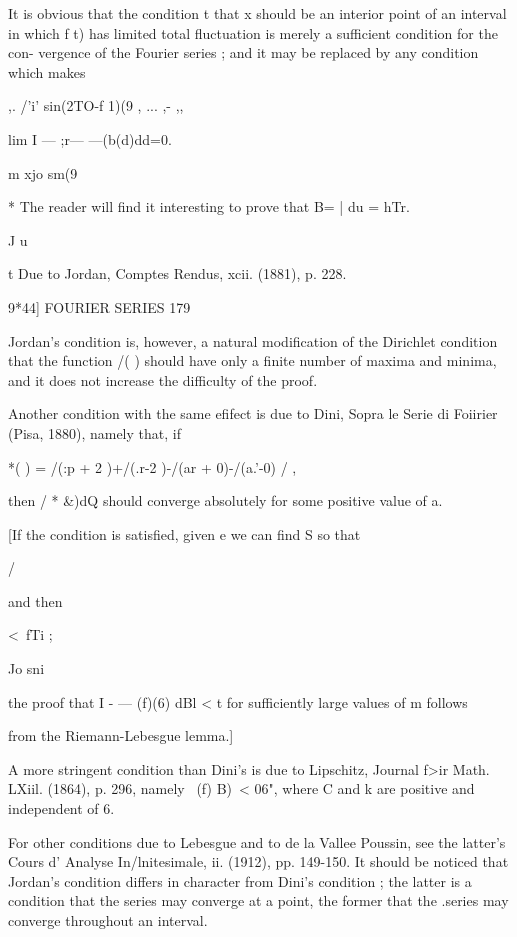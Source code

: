 It is obvious that the condition t that x should be an interior point
of an interval in which f t) has limited total fluctuation is merely a
sufficient condition for the con- vergence of the Fourier series ; and
it may be replaced by any condition which makes

,. /'i' sin(2TO-f 1)(9 , ... ,- ,,

lim I — ;r— —(b(d)dd=0.

m xjo sm(9

* The reader will find it interesting to prove that B= | du = hTr.

J u

t Due to Jordan, Comptes Rendus, xcii. (1881), p. 228.



9*44] FOURIER SERIES 179

Jordan's condition is, however, a natural modification of the
Dirichlet condition that the function /( ) should have only a finite
number of maxima and minima, and it does not increase the difficulty
of the proof.

Another condition with the same efifect is due to Dini, Sopra le Serie
di Foiirier (Pisa, 1880), namely that, if

*( ) = /(:p + 2 )+/(.r-2 )-/(ar + 0)-/(a.'-0) / ,

then / * \&)dQ should converge absolutely for some positive value of
a.

[If the condition is satisfied, given e we can find S so that



/



and then



<\ fTi ;



Jo sni

the proof that I - — (f)(6) dBl < t for sufficiently large values of m
follows

from the Riemann-Lebesgue lemma.]

A more stringent condition than Dini's is due to Lipschitz, Journal
f>ir Math. LXiil. (1864), p. 296, namely \ (f) B)\ < 06", where C and
k are positive and independent of 6.

For other conditions due to Lebesgue and to de la Vallee Poussin, see
the latter's Cours d' Analyse In/lnitesimale, ii. (1912), pp. 149-150.
It should be noticed that Jordan's condition differs in character from
Dini's condition ; the latter is a condition that the series may
converge at a point, the former that the .series may converge
throughout an interval.

